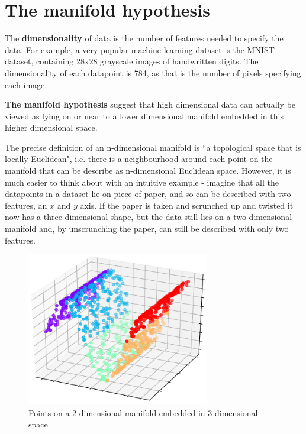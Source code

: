 \documentclass[12pt,a4paper,twoside,openright]{report}
\begin{document}
\section{The manifold hypothesis}

The \textbf{dimensionality} of data is the number of features needed to specify the data. For example, a very popular machine learning dataset
is the MNIST dataset, containing 28x28 grayscale images of handwritten digits. The dimensionality of each datapoint is 784, as that is the
number of pixels specifying each image.

\textbf{The manifold hypothesis} suggest that high dimensional data can actually be viewed as lying on or near to a
lower dimensional manifold embedded in this higher dimensional space.

The precise definition of an n-dimensional manifold is ``a 
topological space that is locally Euclidean", i.e. there is a neighbourhood around each point on the manifold that can be describe as n-dimensional 
Euclidean space. However, it is much easier to think about with an intuitive example - imagine that all the datapoints in a 
dataset lie on piece of paper, and so can be described with two features, an $x$ and $y$ axis. If the paper is taken and scrunched up and 
twisted it now has a three dimensional shape, but the data still lies on a two-dimensional manifold and, by unscrunching the paper, can still 
be described with only two features.
\begin{figure}[H]
  \centering
  \includegraphics[width=8cm]{figs/manifold.png}
  \caption{Points on a 2-dimensional manifold embedded in 3-dimensional space}
  \label{fig:manifold}
\end{figure}
\end{document}
